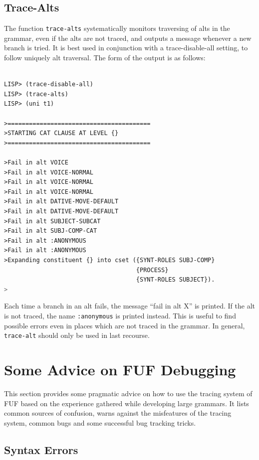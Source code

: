 \documentclass[10pt,a4paper]{report}
\begin{document}
\subsection{Trace-Alts}

The function {\tt trace-alts} systematically monitors traversing of alts in
the grammar, even if the alts are not traced, and outputs a message
whenever a new branch is tried.  It is best used in conjunction with a
trace-disable-all setting, to follow uniquely alt traversal.  The form of
the output is as follows:
 
\begin{lstlisting}[language=Lisp]

LISP> (trace-disable-all)
LISP> (trace-alts)
LISP> (uni t1)

>========================================
>STARTING CAT CLAUSE AT LEVEL {}
>========================================

>Fail in alt VOICE
>Fail in alt VOICE-NORMAL
>Fail in alt VOICE-NORMAL
>Fail in alt VOICE-NORMAL
>Fail in alt DATIVE-MOVE-DEFAULT
>Fail in alt DATIVE-MOVE-DEFAULT
>Fail in alt SUBJECT-SUBCAT
>Fail in alt SUBJ-COMP-CAT
>Fail in alt :ANONYMOUS
>Fail in alt :ANONYMOUS
>Expanding constituent {} into cset ({SYNT-ROLES SUBJ-COMP}
                                     {PROCESS}
                                     {SYNT-ROLES SUBJECT}).
>
\end{lstlisting}

Each time a branch in an alt fails, the message ``fail in alt X'' is
printed.  If the alt is not traced, the name {\tt :anonymous} is printed
instead.  This is useful to find possible errors even in places which are
not traced in the grammar.  In general, {\tt trace-alt} should only be used
in last recourse.


\section{Some Advice on FUF Debugging}

This section provides some pragmatic advice on how to use the tracing
system of FUF based on the experience gathered while developing large
grammars.  It lists common sources of confusion, warns against the
misfeatures of the tracing system, common bugs and some successful bug
tracking tricks.


\subsection{Syntax Errors}
\end{document}
